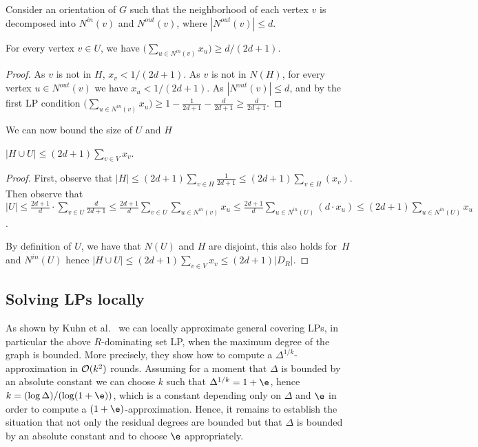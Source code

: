 Consider an orientation of $G$ such that the neighborhood of each vertex
$v$ is decomposed into $N^{in}(v)$ and $N^{out}(v)$, where $|N^{out}(v)|\le d$.

\begin{claim}
  For every vertex $v\in U$, we have
  $\big(\sum_{u\in N^{in}(v)}x_u \big)\ge d/(2d+1)$.
\end{claim}
\begin{proof}
  As $v$ is not in $H$, $x_v<1/(2d+1)$. As $v$ is not in $N(H)$, for every
  vertex $u\in N^{out}(v)$ we have $x_u<1/(2d+1)$. As $|N^{out}(v)|\le d$,
  and by the first LP condition
  $\big(\sum_{u\in N^{in}(v)}x_u \big)\ge 1- \frac{1}{2d+1} - \frac{d}{2d+1}
  \ge \frac{d}{2d+1}$.
\end{proof}

We can now bound the size of $U$ and $H$
\begin{claim}
  $|H\cup U| \le (2d+1)\sum_{v\in V}x_v$.
\end{claim}
\begin{proof}
  First, observe that
  $|H|\le (2d+1)\sum_{v\in H}\frac{1}{2d+1}
  \le (2d+1)\sum_{v\in H}(x_v)$.
  Then observe that\linebreak
  $|U|\le \frac{2d+1}{d}\cdot\sum_{v\in U} \frac{d}{2d+1}
  \le \frac{2d+1}{d}\sum_{v\in U}\sum_{u\in N^{in}(v)}x_u
  \le \frac{2d+1}{d}\sum_{u\in N^{in}(U)} (d\cdot x_u)
  \le (2d+1) \sum_{u\in N^{in}(U)} x_u$.

  By definition of $U$, we have that $N(U)$ and $H$ are disjoint, this also
  holds for~$H$ and $N^{in}(U)$ hence $|H\cup U| \le (2d+1)\sum_{v\in V}x_v\leq (2d+1)|D_R|$.
\end{proof}

\subsection{Solving LPs locally}

As shown by Kuhn et al.~\cite{kuhn2006price} we can locally approximate
general covering LPs, in particular the above $R$-dominating set LP,
when the maximum
degree of the graph is bounded. More precisely, they show how to compute
a $\Delta^{1/k}$-approximation in $\mathcal{O}(k^2)$ rounds. Assuming for a
moment that $\Delta$ is bounded by an absolute constant we can
choose $k$ such that $\Delta^{1/k}=1+\e$,
hence $k=(\log \Delta)/(\log (1+\e))$, which is a constant depending
only on $\Delta$ and $\e$ in order to compute a
$(1+\e)$-approximation. Hence, it remains to establish the situation
that not only the residual degrees are bounded but that $\Delta$ is
bounded by an absolute constant and to choose $\e$ appropriately.

